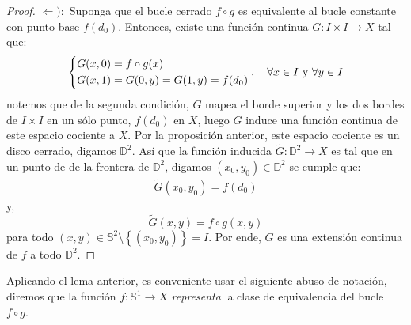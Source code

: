 \documentclass[12pt]{report}
\theoremstyle{largebreak}
\newcommand\cf[3]{\ensuremath{#1:#2\rightarrow#3}}
\begin{document}
\begin{proof}
        $\Leftarrow):$ Suponga que el bucle cerrado $f\circ g$ es equivalente al bucle constante con punto base $f(d_0)$. Entonces, existe una función continua $\cf{G}{I\times I}{X}$ tal que:
        \begin{equation*}
            \left\{
                \begin{split}
                    G(x,0) & = f\circ g(x)\\
                    G(x,1) & = G(0,y) = G(1,y) = f(d_0)\\
                \end{split}
            \right.,\quad\forall x\in I\textup{ y }\forall y\in I
        \end{equation*}
        notemos que de la segunda condición, $G$ mapea el borde superior y los dos bordes de $I\times I$ en un sólo punto, $f(d_0)$ en $X$, luego $G$ induce una función continua de este espacio cociente a $X$. Por la proposición anterior, este espacio cociente es un disco cerrado, digamos $\mathbb{D}^2$. Así que la función inducida $\cf{\widetilde{G}}{\mathbb{D}^2}{X}$ es tal que en un punto de de la frontera de $\mathbb{D}^2$, digamos $(x_0,y_0)\in\mathbb{D}^2$ se cumple que:
        \begin{equation*}
            \begin{split}
                \widetilde{G}(x_0,y_0)=f(d_0)
            \end{split}
        \end{equation*}
        y,
        \begin{equation*}
            \widetilde{G}(x,y)=f\circ g(x,y)
        \end{equation*}
        para todo $(x,y)\in\mathbb{S}^2\setminus\left\{(x_0,y_0)\right\}=I$. Por ende, $G$ es una extensión continua de $f$ a todo $\mathbb{D}^2$. 
    \end{proof}

    Aplicando el lema anterior, es conveniente usar el siguiente abuso de notación, diremos que la función $\cf{f}{\mathbb{S}^1}{X}$ \textit{representa} la clase de equivalencia del bucle $f\circ g$.
\end{document}
